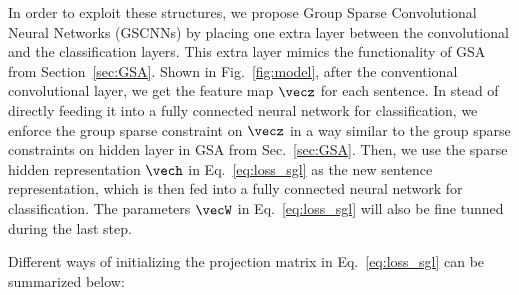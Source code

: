 In order to exploit these structures, %
we propose Group Sparse Convolutional Neural Networks (GSCNNs) by placing one extra layer between the convolutional and the classification layers. 
This extra layer mimics the functionality of GSA from Section~\ref{sec:GSA}.
Shown in Fig.~\ref{fig:model},
after the conventional convolutional layer, we get the feature map $\vecz$ for each sentence. 
In stead of directly feeding it into a fully connected neural network for classification, 
we enforce the group sparse constraint on $\vecz$ in a way similar to the group sparse constraints on hidden layer in GSA from Sec.~\ref{sec:GSA}. %
Then, we use the sparse hidden representation $\vech$ in Eq.~\ref{eq:loss_sgl} as the new sentence representation,
which is then fed %
into a fully connected neural network for classification. The parameters $\vecW$ in Eq.~\ref{eq:loss_sgl} will also be fine tunned during the last step. 



Different ways of initializing the projection matrix in Eq.~\ref{eq:loss_sgl} can be summarized below: %

